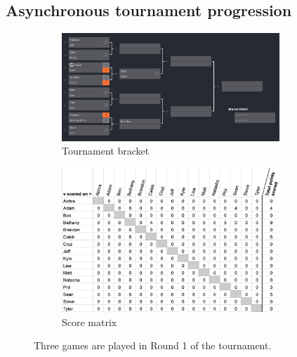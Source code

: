 \documentclass[letterpaper, 10 pt, conference]{ieeeconf}  %
\begin{document}
\subsection{Asynchronous tournament progression}
\begin{figure}[hb]
        \centering
        \begin{subfigure}[h]{0.4\textwidth}
                \centering
                \includegraphics[width=0.9\textwidth]{fig/singles-bracket_1.png}
                \caption{Tournament bracket}
        \end{subfigure}
        \begin{subfigure}[h]{0.4\textwidth}
                \centering
                \includegraphics[width=0.9\textwidth]{fig/score-matrix_1.png}
                \caption{Score matrix}
        \end{subfigure}
        \caption{Three games are played in Round 1 of the tournament.}
\end{figure}
\end{document}
